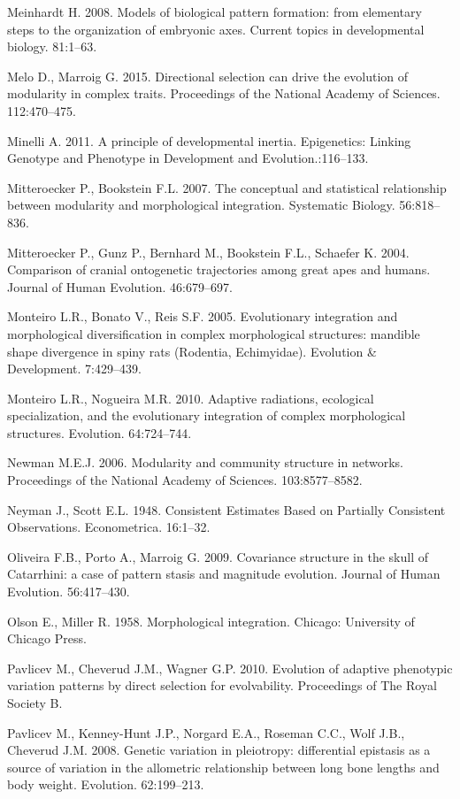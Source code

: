 \documentclass[12pt,]{article}
\begin{document}
Meinhardt H. 2008. Models of biological pattern formation: from
elementary steps to the organization of embryonic axes. Current topics
in developmental biology. 81:1--63.

Melo D., Marroig G. 2015. Directional selection can drive the evolution
of modularity in complex traits. Proceedings of the National Academy of
Sciences. 112:470--475.

Minelli A. 2011. A principle of developmental inertia. Epigenetics:
Linking Genotype and Phenotype in Development and Evolution.:116--133.

Mitteroecker P., Bookstein F.L. 2007. The conceptual and statistical
relationship between modularity and morphological integration.
Systematic Biology. 56:818--836.

Mitteroecker P., Gunz P., Bernhard M., Bookstein F.L., Schaefer K. 2004.
Comparison of cranial ontogenetic trajectories among great apes and
humans. Journal of Human Evolution. 46:679--697.

Monteiro L.R., Bonato V., Reis S.F. 2005. Evolutionary integration and
morphological diversification in complex morphological structures:
mandible shape divergence in spiny rats (Rodentia, Echimyidae).
Evolution \& Development. 7:429--439.

Monteiro L.R., Nogueira M.R. 2010. Adaptive radiations, ecological
specialization, and the evolutionary integration of complex
morphological structures. Evolution. 64:724--744.

Newman M.E.J. 2006. Modularity and community structure in networks.
Proceedings of the National Academy of Sciences. 103:8577--8582.

Neyman J., Scott E.L. 1948. Consistent Estimates Based on Partially
Consistent Observations. Econometrica. 16:1--32.

Oliveira F.B., Porto A., Marroig G. 2009. Covariance structure in the
skull of Catarrhini: a case of pattern stasis and magnitude evolution.
Journal of Human Evolution. 56:417--430.

Olson E., Miller R. 1958. Morphological integration. Chicago: University
of Chicago Press.

Pavlicev M., Cheverud J.M., Wagner G.P. 2010. Evolution of adaptive
phenotypic variation patterns by direct selection for evolvability.
Proceedings of The Royal Society B.

Pavlicev M., Kenney-Hunt J.P., Norgard E.A., Roseman C.C., Wolf J.B.,
Cheverud J.M. 2008. Genetic variation in pleiotropy: differential
epistasis as a source of variation in the allometric relationship
between long bone lengths and body weight. Evolution. 62:199--213.
\end{document}
